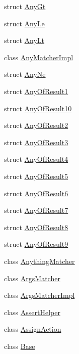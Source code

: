 \begin{DoxyCompactItemize}
\item 
struct \hyperlink{structtesting_1_1internal_1_1_any_gt}{Any\+Gt}
\item 
struct \hyperlink{structtesting_1_1internal_1_1_any_le}{Any\+Le}
\item 
struct \hyperlink{structtesting_1_1internal_1_1_any_lt}{Any\+Lt}
\item 
class \hyperlink{classtesting_1_1internal_1_1_any_matcher_impl}{Any\+Matcher\+Impl}
\item 
struct \hyperlink{structtesting_1_1internal_1_1_any_ne}{Any\+Ne}
\item 
struct \hyperlink{structtesting_1_1internal_1_1_any_of_result1}{Any\+Of\+Result1}
\item 
struct \hyperlink{structtesting_1_1internal_1_1_any_of_result10}{Any\+Of\+Result10}
\item 
struct \hyperlink{structtesting_1_1internal_1_1_any_of_result2}{Any\+Of\+Result2}
\item 
struct \hyperlink{structtesting_1_1internal_1_1_any_of_result3}{Any\+Of\+Result3}
\item 
struct \hyperlink{structtesting_1_1internal_1_1_any_of_result4}{Any\+Of\+Result4}
\item 
struct \hyperlink{structtesting_1_1internal_1_1_any_of_result5}{Any\+Of\+Result5}
\item 
struct \hyperlink{structtesting_1_1internal_1_1_any_of_result6}{Any\+Of\+Result6}
\item 
struct \hyperlink{structtesting_1_1internal_1_1_any_of_result7}{Any\+Of\+Result7}
\item 
struct \hyperlink{structtesting_1_1internal_1_1_any_of_result8}{Any\+Of\+Result8}
\item 
struct \hyperlink{structtesting_1_1internal_1_1_any_of_result9}{Any\+Of\+Result9}
\item 
class \hyperlink{classtesting_1_1internal_1_1_anything_matcher}{Anything\+Matcher}
\item 
class \hyperlink{classtesting_1_1internal_1_1_args_matcher}{Args\+Matcher}
\item 
class \hyperlink{classtesting_1_1internal_1_1_args_matcher_impl}{Args\+Matcher\+Impl}
\item 
class \hyperlink{classtesting_1_1internal_1_1_assert_helper}{Assert\+Helper}
\item 
class \hyperlink{classtesting_1_1internal_1_1_assign_action}{Assign\+Action}
\item 
class \hyperlink{classtesting_1_1internal_1_1_base}{Base}

\end{DoxyCompactItemize}
